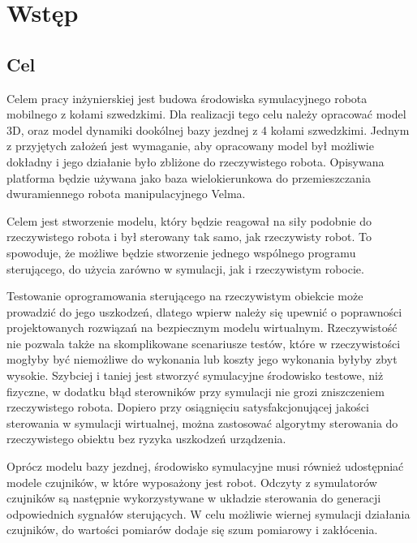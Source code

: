 \chapter{Wstęp}
\label{sec:description}
	\section{Cel}
	Celem pracy inżynierskiej jest budowa środowiska symulacyjnego robota mobilnego z kołami szwedzkimi.
	Dla realizacji tego celu należy opracować model 3D, oraz model dynamiki dookólnej bazy jezdnej z 4 kołami szwedzkimi.
	Jednym z przyjętych założeń jest wymaganie, aby opracowany model był możliwie dokładny i jego działanie było zbliżone do rzeczywistego robota.
	Opisywana platforma będzie używana jako baza wielokierunkowa do przemieszczania dwuramiennego robota manipulacyjnego Velma.

	Celem jest stworzenie modelu, który będzie reagował na siły podobnie do rzeczywistego robota i był sterowany tak samo, jak rzeczywisty robot.
	To spowoduje, że możliwe będzie stworzenie jednego wspólnego programu sterującego, do użycia zarówno w symulacji, jak i rzeczywistym robocie.

	Testowanie oprogramowania sterującego na rzeczywistym obiekcie może prowadzić do jego uszkodzeń, 
	dlatego wpierw należy się upewnić o poprawności projektowanych rozwiązań na bezpiecznym modelu wirtualnym.
	Rzeczywistość nie pozwala także na skomplikowane scenariusze testów, które w rzeczywistości mogłyby być niemożliwe do wykonania lub koszty jego wykonania byłyby zbyt wysokie.
	Szybciej i taniej jest stworzyć symulacyjne środowisko testowe, niż fizyczne, w dodatku błąd sterowników przy symulacji nie grozi zniszczeniem rzeczywistego robota.
	Dopiero przy osiągnięciu satysfakcjonującej jakości sterowania w symulacji wirtualnej, 
	można zastosować algorytmy sterowania do rzeczywistego obiektu bez ryzyka uszkodzeń urządzenia.

	Oprócz modelu bazy jezdnej, środowisko symulacyjne musi również udostępniać modele czujników, w które wyposażony jest robot. 
	Odczyty z symulatorów czujników są następnie wykorzystywane w układzie sterowania do generacji odpowiednich sygnałów sterujących.
	W celu możliwie wiernej symulacji działania czujników, do wartości pomiarów dodaje się szum pomiarowy i zakłócenia.


